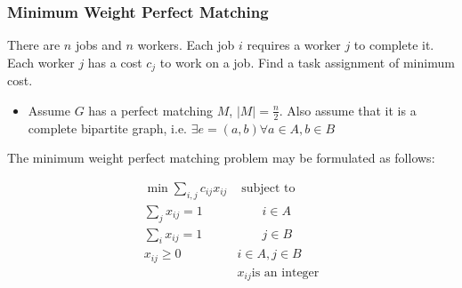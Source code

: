 \documentclass[../notes.tex]{subfiles}
\begin{document}
\subsubsection{Minimum Weight Perfect Matching}

\begin{blockquote}
    There are $ n $ jobs and $ n $ workers. Each job $ i $ requires a worker $ j $ to complete it. Each worker $ j $ has a cost $ c_j $ to work on a job. Find a task assignment of minimum cost.
\end{blockquote}

\begin{itemize}
    \item Assume $ G $ has a perfect matching $ M $, $ |M| = \frac{n}{2} $. Also assume that it is a complete bipartite graph, i.e. $ \exists e=(a,b) \forall a \in A, b \in B $
\end{itemize}


The minimum weight perfect matching problem may be formulated as follows:

\begin{equation}
    \begin{split}
        \min \sum_{i, j} c_{ij} x_{ij} & \text{ subject to}  \\
         \sum_j x_{ij} = 1 &\qquad i \in A  \\
         \sum_i x_{ij} = 1 &\qquad j \in B  \\
         x_{ij} \ge  0 & i \in A, j \in B \\
                       & x_{ij} \text{is an integer}
    \end{split}
\end{equation}

\end{document}
